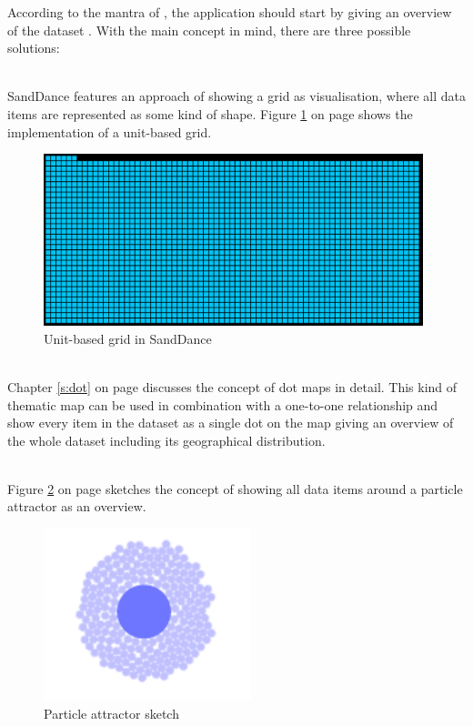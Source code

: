 According to the mantra of \citeauthor{Shneiderman1996}, the application should start by giving an overview of the dataset . With the main concept in mind, there are three possible solutions:
\begin{enumerate}

 \hfill \\
SandDance features an approach of showing a grid as visualisation, where all data items are represented as some kind of shape. Figure \ref{fig:sanddance-grid} on page \pageref{fig:sanddance-grid} shows the implementation of a unit-based grid.

\begin{figure}[!htb]
\centering
\includegraphics[height=5cm]{images/methods/related/sanddance-grid.png}
\caption[
    Unit-based grid in SandDance.
]{Unit-based grid in SandDance}
\label{fig:sanddance-grid}
\end{figure}
 \hfill \\
Chapter \ref{s:dot} on page \pageref{s:dot} discusses the concept of dot maps in detail. This kind of thematic map can be used in combination with a one-to-one relationship and show every item in the dataset as a single dot on the map giving an overview of the whole dataset including its geographical distribution.

 \hfill \\
Figure \ref{fig:particle-attractor} on page \pageref{fig:particle-attractor} sketches the concept of showing all data items around a particle attractor as an overview.

\begin{figure}[!htb]
\centering
\includegraphics[height=5cm]{images/methods/related/particle-attractor.png}
\caption[
    Particle attractor sketch.
]{Particle attractor sketch}
\label{fig:particle-attractor}
\end{figure}
\end{enumerate}

